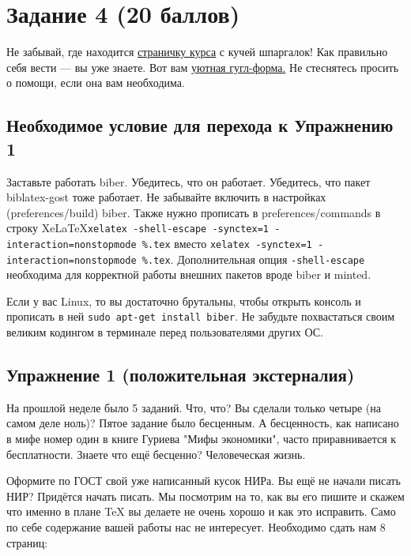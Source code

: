 \documentclass[12pt, a4paper, oneside]{article}
\begin{document}
	
	\section*{Задание 4  (20 баллов)  }
	
	Не забывай, где находится  \href{https://fulyankin.github.io/LaTeX/}{страничку курса} с кучей шпаргалок! Как правильно себя вести — вы уже знаете. Вот вам \href{https://docs.google.com/forms/d/e/1FAIpQLSe11kxKVfv07iCL1E9yNX7ll9swKImiVwRr1H70lslGzInRSg/viewform}{уютная гугл-форма.}   Не стеснятесь просить о помощи, если она вам необходима.
	

\subsection*{Необходимое условие для перехода к Упражнению 1 }

Заставьте работать biber. Убедитесь, что он работает. Убедитесь, что пакет biblatex-gost  тоже работает.  Не забывайте включить в настройках (preferences/build) biber. Также нужно прописать в preferences/commands в строку Xe\LaTeX \texttt{xelatex -shell-escape -synctex=1 -interaction=nonstopmode \%.tex} вместо \texttt{xelatex -synctex=1 -interaction=nonstopmode \%.tex}. Дополнительная опция \texttt{-shell-escape} необходима для корректной работы внешних пакетов вроде biber и minted.

Если у вас Linux, то вы достаточно брутальны, чтобы открыть консоль и прописать в ней  \texttt{sudo apt-get install biber}. Не забудьте похвастаться своим великим кодингом в терминале перед пользователями других ОС.

\subsection*{Упражнение 1  (положительная экстерналия)}

На прошлой неделе было 5 заданий. Что, что? Вы сделали только четыре (на самом деле ноль)? Пятое задание было бесценным. 
А бесценность, как написано в мифе номер один в книге Гуриева "Мифы экономики", часто приравнивается к бесплатности. Знаете что ещё бесценно? Человеческая жизнь. 

Оформите по ГОСТ свой уже написанный кусок НИРа. Вы ещё не начали писать НИР? Придётся начать писать. Мы посмотрим на то, как вы его пишите и скажем что именно в плане TeX вы делаете не очень хорошо и как это исправить. Само по себе содержание вашей работы нас не интересует. Необходимо сдать нам 8 страниц:
\end{document}
